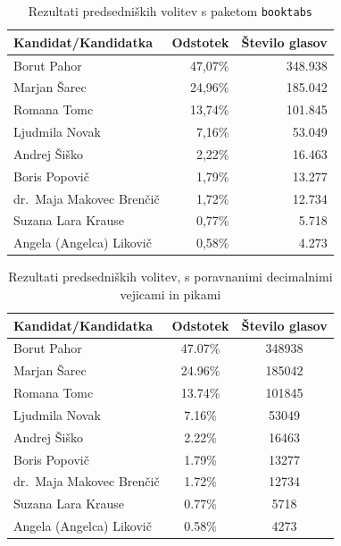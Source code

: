 \documentclass{article}
\begin{document}
\begin{table}[htb]
  \centering
  \begin{tabular}{lrr}
  \toprule
  \textbf{Kandidat/Kandidatka}        & \textbf{Odstotek} & \textbf{Število glasov} \\ \midrule
  Borut Pahor                & 47,07\%  & 348.938 \\
  Marjan Šarec               & 24,96\%  & 185.042 \\
  Romana Tomc                & 13,74\%  & 101.845 \\
  Ljudmila Novak             & 7,16\%   & 53.049 \\
  Andrej Šiško               & 2,22\%   & 16.463 \\
  Boris Popovič              & 1,79\%   & 13.277 \\
  dr.\ Maja Makovec Brenčič  & 1,72\%   & 12.734 \\
  Suzana Lara Krause         & 0,77\%   & 5.718 \\
  Angela (Angelca) Likovič   & 0,58\%   & 4.273 \\
  \bottomrule
  \end{tabular}
  \caption{Rezultati predsedniških volitev s paketom \texttt{booktabs}}
  \label{tab:volitve-booktabs}
\end{table}

\begin{table}[htb]
  \centering
  \begin{tabular}{lSS[group-minimum-digits=3]}
  \toprule
  \textbf{Kandidat/Kandidatka}        & \textbf{Odstotek} & \textbf{Število glasov} \\ \midrule
  Borut Pahor                & 47.07\%  & 348938 \\
  Marjan Šarec               & 24.96\%  & 185042 \\
  Romana Tomc                & 13.74\%  & 101845 \\
  Ljudmila Novak             & 7.16\%   & 53049 \\
  Andrej Šiško               & 2.22\%   & 16463 \\
  Boris Popovič              & 1.79\%   & 13277 \\
  dr.\ Maja Makovec Brenčič  & 1.72\%   & 12734 \\
  Suzana Lara Krause         & 0.77\%   & 5718 \\
  Angela (Angelca) Likovič   & 0.58\%   & 4273 \\
  \bottomrule
  \end{tabular}
  \caption{Rezultati predsedniških volitev, s poravnanimi decimalnimi vejicami in pikami}
  \label{tab:volitve-align}
\end{table}
\end{document}
